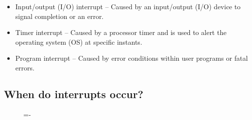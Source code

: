 \documentclass[a4paper]{systems-software}
\begin{document}
\begin{itemize}
	\item Input/output (I/O) interrupt -- Caused by an input/output (I/O) device to signal completion or an error.
	\item Timer interrupt -- Caused by a processor timer and is used to alert the operating system (OS) at specific instants.
	\item Program interrupt -- Caused by error conditions within user programs or fatal errors.
\end{itemize}


\subsection*{When do interrupts occur?}

\begin{figure}[H]
  \lineskip=-\fboxrule
\end{figure}
\end{document}
